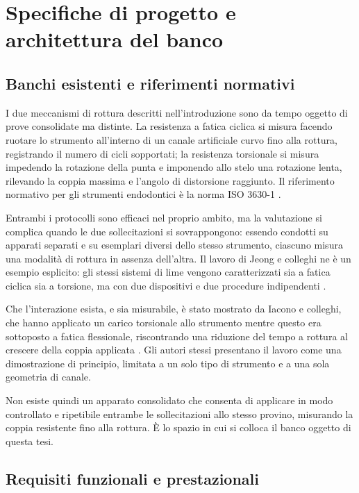 \chapter{Specifiche di progetto e architettura del banco}
\label{cap:specifiche}

\section{Banchi esistenti e riferimenti normativi}

I due meccanismi di rottura descritti nell'introduzione sono da tempo oggetto di
prove consolidate ma distinte. La resistenza a fatica ciclica si misura
facendo ruotare lo strumento all'interno di un canale artificiale curvo fino alla
rottura, registrando il numero di cicli sopportati; la resistenza torsionale si
misura impedendo la rotazione della punta e imponendo allo stelo una rotazione
lenta, rilevando la coppia massima e l'angolo di distorsione raggiunto. Il
riferimento normativo per gli strumenti endodontici è la norma ISO 3630-1
\cite{iso3630}.

Entrambi i protocolli sono efficaci nel proprio ambito, ma la valutazione si complica quando le due sollecitazioni si sovrappongono: essendo condotti su
apparati separati e su esemplari diversi dello stesso strumento, ciascuno misura
una modalità di rottura in assenza dell'altra. Il lavoro di Jeong e colleghi ne è
un esempio esplicito: gli stessi sistemi di lime vengono caratterizzati sia a
fatica ciclica sia a torsione, ma con due dispositivi e due procedure
indipendenti \cite{jeong2024}.

Che l'interazione esista, e sia misurabile, è stato mostrato da Iacono e
colleghi, che hanno applicato un carico torsionale allo strumento mentre questo
era sottoposto a fatica flessionale, riscontrando una riduzione del tempo a
rottura al crescere della coppia applicata \cite{iacono2021}. Gli autori stessi
presentano il lavoro come una dimostrazione di principio, limitata a un solo tipo
di strumento e a una sola geometria di canale.

Non esiste quindi un apparato consolidato che consenta di applicare in modo
controllato e ripetibile entrambe le sollecitazioni allo stesso provino,
misurando la coppia resistente fino alla rottura. È lo spazio in cui si colloca
il banco oggetto di questa tesi.

\section{Requisiti funzionali e prestazionali}
\label{sec:requisiti}

